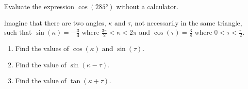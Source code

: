 \begin{myExit}
	Evaluate the expression $\cos(\ang{285})$ without a calculator.
\end{myExit}
\vfill

\begin{myExit}
	Imagine that there are two angles, $\kappa$ and $\tau$, not necessarily in the same triangle, such that $\sin(\kappa)=-\frac{3}{4}$ where $\frac{3\pi}{2}<\kappa<2\pi$ and $\cos(\tau)=\frac{3}{8}$ where $0<\tau<\frac{\pi}{2}$. 
		\begin{enumerate}
			\item Find the values of $\cos(\kappa)$ and $\sin(\tau)$.
			\vfill
			\item Find the value of $\sin(\kappa-\tau)$.
			\vfill
			\item Find the value of $\tan(\kappa+\tau)$.
			\vfill
		\end{enumerate}
\end{myExit}
